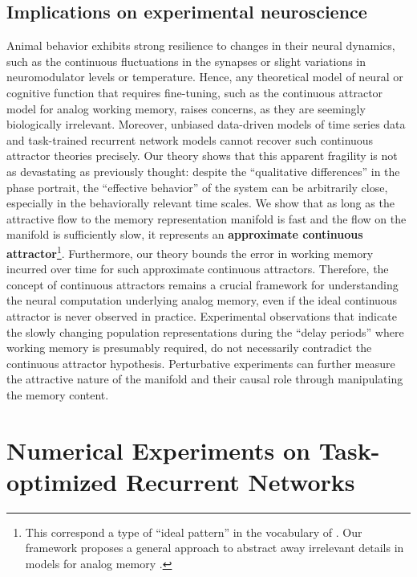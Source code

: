 \documentclass{article} %
\newcounter{ct}
\theoremstyle{definition}
\theoremstyle{remark}
\begin{document}
\subsection{Implications on experimental neuroscience}\label{sec:implications}
Animal behavior exhibits strong resilience to changes in their neural dynamics, such as the continuous fluctuations in the synapses or slight variations in neuromodulator levels or temperature.
Hence, any theoretical model of neural or cognitive function that requires fine-tuning, such as the continuous attractor model for analog working memory, raises concerns, as they are seemingly biologically irrelevant.
Moreover, unbiased data-driven models of time series data and task-trained recurrent network models cannot recover such continuous attractor theories precisely.
Our theory shows that this apparent fragility is not as devastating as previously thought: despite the ``qualitative differences'' in the phase portrait, the ``effective behavior'' of the system can be arbitrarily close, especially in the behaviorally relevant time scales.
We show that as long as the attractive flow to the memory representation manifold is fast and the flow on the manifold is sufficiently slow, it represents an \textbf{approximate continuous attractor}\footnote{This correspond a type of ``ideal pattern'' in the vocabulary of \citet{chirimuuta2024brain}. Our framework proposes a general approach to abstract away irrelevant details in models for analog memory \citep{potochnik2017idealization}.}.
Furthermore, our theory bounds the error in working memory incurred over time for such approximate continuous attractors.
Therefore, the concept of continuous attractors remains a crucial framework for understanding the neural computation underlying analog memory, even if the ideal continuous attractor is never observed in practice.
Experimental observations that indicate the slowly changing population representations during the ``delay periods'' where working memory is presumably required, do not necessarily contradict the continuous attractor hypothesis. 
Perturbative experiments can further measure the attractive nature of the manifold and their causal role through manipulating the memory content.



\section{Numerical Experiments on Task-optimized Recurrent Networks}\label{sec:experiments}
\end{document}
